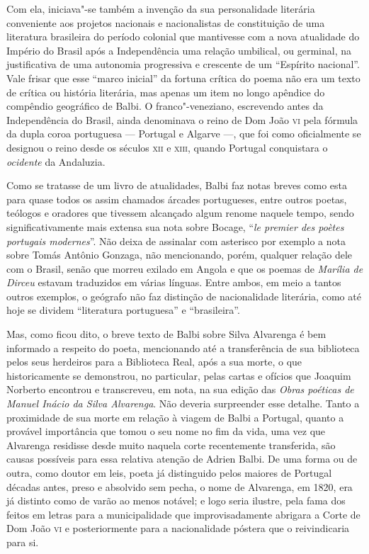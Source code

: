 Com ela, iniciava"-se também a invenção da sua personalidade literária
conveniente aos projetos nacionais e nacionalistas de constituição de uma
literatura brasileira do período colonial que mantivesse com a nova atualidade
do Império do Brasil após a Independência uma relação umbilical, ou germinal, na
justificativa de uma autonomia progressiva e crescente de um ``Espírito
nacional''.  Vale frisar que esse ``marco inicial'' da fortuna crítica do poema
não era um texto de crítica ou história literária, mas apenas um item no longo
apêndice do compêndio geográfico de Balbi.  O franco"-veneziano, escrevendo antes da Independência do Brasil, ainda denominava o reino de Dom João \textsc{vi} pela fórmula da dupla coroa portuguesa --- Portugal e Algarve ---, que foi como oficialmente se designou o reino desde os séculos \textsc{xii} e \textsc{xiii}, quando Portugal conquistara o \textit{ocidente} da Andaluzia.

Como se tratasse de um livro de atualidades, Balbi faz notas breves como esta
para quase todos os assim chamados árcades portugueses, entre outros poetas,
teólogos e oradores que tivessem alcançado algum renome naquele tempo, sendo
significativamente mais extensa sua nota sobre Bocage, ``\textit{le premier des
poètes portugais modernes}''.  Não deixa de assinalar com asterisco por exemplo
a nota sobre Tomás Antônio Gonzaga, não mencionando, porém, qualquer relação
dele com o Brasil, senão que morreu exilado em Angola e que os poemas de
\textit{Marília de Dirceu} estavam traduzidos em várias línguas.  Entre ambos,
em meio a tantos outros exemplos, o geógrafo não faz distinção de nacionalidade
literária, como até hoje se dividem ``literatura portuguesa'' e ``brasileira''.

Mas, como ficou dito, o breve texto de Balbi sobre Silva Alvarenga é bem
informado a respeito do poeta, mencionando até a transferência de sua biblioteca
pelos seus herdeiros para a Biblioteca Real, após a sua morte, o que
historicamente se demonstrou, no particular, pelas cartas e ofícios que Joaquim
Norberto encontrou e transcreveu, em nota, na sua edição das \textit{Obras
poéticas de Manuel Inácio da Silva Alvarenga}. Não deveria surpreender esse
detalhe.  Tanto a proximidade de sua morte em relação à viagem de Balbi a
Portugal, quanto a provável importância que tomou o seu nome no fim da vida, uma
vez que Alvarenga residisse desde muito naquela corte recentemente transferida,
são causas possíveis para essa relativa atenção de Adrien Balbi.  De uma forma
ou de outra, como doutor em leis, poeta já distinguido pelos maiores de Portugal
décadas antes, preso e absolvido sem pecha, o nome de Alvarenga, em 1820, era já
distinto como de varão ao menos notável; e logo seria ilustre, pela fama dos
feitos em letras para a municipalidade que improvisadamente abrigara a Corte de
Dom João \textsc{vi} e posteriormente para a nacionalidade póstera que o
reivindicaria para si.


